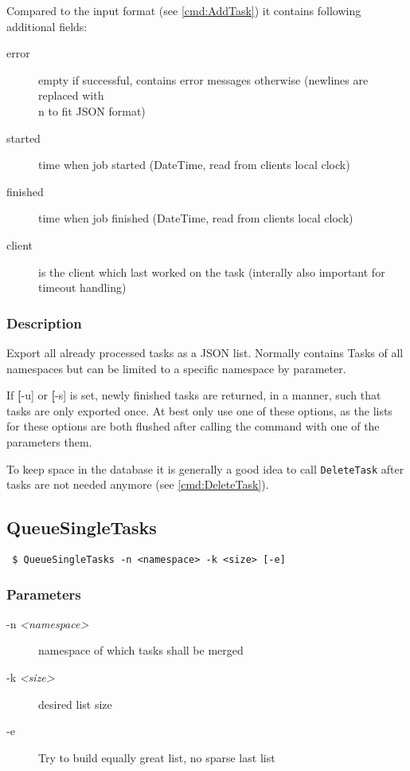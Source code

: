\documentclass[a4paper,11pt]{article}
\begin{document}
Compared to the input format (see \ref{cmd:AddTask}) it contains following additional fields:
\begin{description}
\item[error] empty if successful, contains error messages otherwise (newlines are replaced with \\n to fit JSON format)
\item[started] time when job started (DateTime, read from clients local clock)
\item[finished] time when job finished (DateTime, read from clients local clock)
\item[client] is the client which last worked on the task (interally also important for timeout handling)
\end{description}


\subsubsection{Description}
Export all already processed tasks as a JSON list. Normally contains Tasks of all namespaces but can be limited to a specific namespace by parameter.

If \textbf[-u] or \textbf[-s] is set, newly finished tasks are returned, in a manner, such that tasks are only exported once. At best only use one of these options, as the lists for these options are both flushed after calling the command with one of the parameters them.

To keep space in the database it is generally a good idea to call \texttt{DeleteTask} after tasks are not needed anymore (see \ref{cmd:DeleteTask}).

\newpage

\subsection{QueueSingleTasks\label{cmd:QueueSingleTasks}}
\begin{verbatim}
 $ QueueSingleTasks -n <namespace> -k <size> [-e]
\end{verbatim}

\subsubsection{Parameters}
\begin{description}
\item[-n \textit{<namespace>}] namespace of which tasks shall be merged
\item[-k \textit{<size>}] desired list size
\item[-e] Try to build equally great list, no sparse last list
\end{description}
\end{document}
